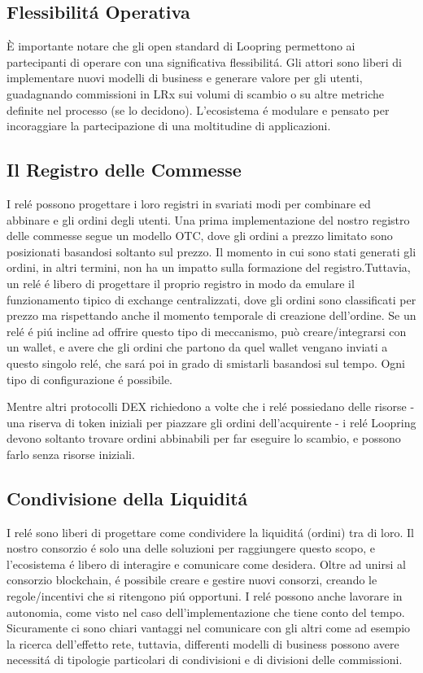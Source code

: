 \documentclass[UTF8,nofonts]{article}
\begin{document}
\begin{multicols}{2}
\section{Flessibilit\'a Operativa\label{sec:business_model}}
È importante notare che gli open standard di Loopring permettono ai partecipanti di operare con una significativa flessibilit\'a. Gli attori sono liberi di implementare nuovi modelli di business e generare valore per gli utenti, guadagnando commissioni in LRx  sui volumi di scambio o su altre metriche definite nel processo (se lo decidono). L'ecosistema \'e modulare e pensato per incoraggiare la partecipazione di una moltitudine di applicazioni.

\subsection{ Il Registro delle Commesse\label{sec:order_book}}
I rel\'e possono progettare i loro registri in svariati modi per combinare ed abbinare e gli ordini degli utenti. Una prima implementazione del nostro registro delle commesse segue un modello OTC, dove gli ordini a prezzo limitato sono posizionati basandosi soltanto sul prezzo. Il momento in cui sono stati generati gli ordini, in altri termini, non ha un impatto sulla formazione del registro.Tuttavia, un rel\'e \'e libero di progettare il proprio registro in modo da emulare il funzionamento tipico di exchange centralizzati, dove gli ordini sono classificati per prezzo ma rispettando anche il momento temporale di creazione dell'ordine. Se un rel\'e \'e pi\'u incline ad offrire questo tipo di meccanismo, può creare/integrarsi con un wallet, e avere che gli ordini che partono da quel wallet vengano inviati a questo singolo rel\'e, che sar\'a poi in grado di smistarli basandosi sul tempo. Ogni tipo di  configurazione \'e possibile.

Mentre altri protocolli DEX richiedono a volte che i rel\'e possiedano delle risorse - una riserva di token iniziali per piazzare gli ordini dell'acquirente - i rel\'e Loopring devono soltanto trovare ordini abbinabili per far eseguire lo scambio, e possono farlo senza risorse iniziali.

\subsection{Condivisione della Liquidit\'a\label{sec:liquidity_sharing}}
I rel\'e sono liberi di progettare come condividere la liquidit\'a (ordini) tra di loro. Il nostro consorzio \'e solo una delle soluzioni per raggiungere questo scopo, e l'ecosistema \'e libero di interagire e comunicare come desidera. Oltre ad unirsi al consorzio blockchain, \'e possibile creare e gestire nuovi consorzi, creando le regole/incentivi che si ritengono pi\'u opportuni. I rel\'e possono anche lavorare in autonomia, come visto nel caso dell'implementazione che tiene conto del tempo. Sicuramente ci sono chiari vantaggi nel comunicare con gli altri come ad esempio la ricerca dell'effetto rete, tuttavia, differenti modelli di business possono avere necessit\'a di tipologie particolari di condivisioni e di divisioni delle commissioni.



\end{multicols}
\end{document}
